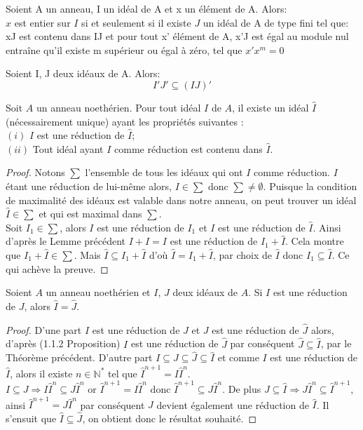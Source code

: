 \begin{maproposition}
	Soient A un anneau, I un idéal de A et x un élément de A. Alors:\\
	$x$ est entier sur $I$ si et seulement si il existe $J$ un idéal de A de type fini tel que: xJ est contenu dans IJ et pour tout x' élément de A, x'J est égal au module nul entraîne qu'il existe m supérieur ou égal à zéro, tel que $x'x^m = 0$
\end{maproposition}
\begin{moncorollaire}
	Soient I, J deux idéaux de A. Alors:
	\[ I'J' \subseteq (IJ)' \]
\end{moncorollaire}
\begin{montheoreme}
	Soit $A$ un anneau noethérien.
	Pour tout idéal $I$ de $A$, il existe un idéal $\hat{I}$ (nécessairement unique) ayant les propriétés suivantes : \\
	$(i)$ $I$ est une réduction de $\hat{I}$;\\
	$(ii)$ Tout idéal ayant $I$ comme réduction est contenu dans $\hat{I}$.
\end{montheoreme}
\begin{proof}
	Notons $\displaystyle \sum$ l'ensemble de tous les idéaux qui ont $I$ comme réduction. $I$ étant une réduction de lui-même alors, $I \in \displaystyle \sum$ donc $\displaystyle \sum \neq \emptyset$. Puisque la condition de maximalité des idéaux est valable dans notre anneau, on peut trouver un idéal $\hat{I} \in \displaystyle \sum$ et qui est maximal dans $\displaystyle \sum$.\\
	Soit $I_1 \in \displaystyle \sum$, alors $I$ est une réduction de $I_1$ et $I$ est une réduction de $\hat{I}$. Ainsi d'après le Lemme précédent $I+I=I$ est une réduction de $I_1+\hat{I}$. Cela montre que $I_1+\hat{I} \in \displaystyle \sum$. Mais $\hat{I} \subseteq I_1+\hat{I}$ d'où $\hat{I} = I_1+\hat{I}$, par choix de $\hat{I}$ donc $I_1 \subseteq \hat{I}$. Ce qui achève la preuve.
\end{proof} 
\begin{moncorollaire}
	Soient $A$ un anneau noethérien et $I$, $J$ deux idéaux de $A$. Si $I$ est une réduction de $J$, alors $\hat{I} = \hat{J}$.
\end{moncorollaire}
\begin{proof}
	D'une part $I$ est une réduction de $J$ et $J$ est une réduction de $\hat{J}$ alors, d'après (1.1.2 Proposition) $I$ est une réduction de $\hat{J}$ par conséquent $\hat{J} \subseteq \hat{I}$, par le Théorème précédent. D'autre part $I \subseteq J \subseteq \hat{J} \subseteq \hat{I}$ et comme $I$ est une réduction de $\hat{I}$, alors il existe $n \in \mathbb{N^*}$ tel que $\hat{I}^{n+1} = I \hat{I}^n$.\\
	$I \subseteq J \Rightarrow I \hat{I}^n \subseteq J \hat{I}^n$ or $\hat{I}^{n+1} = I \hat{I}^n$ donc $\hat{I}^{n+1} \subseteq J \hat{I}^n$. De plus $J \subseteq \hat{I} \Rightarrow  J \hat{I}^n \subseteq \hat{I}^{n+1}$, ainsi $\hat{I}^{n+1} = J \hat{I}^n$ par conséquent $J$ devient également une réduction de $\hat{I}$. Il s'ensuit que $\hat{I} \subseteq \hat{J}$, on obtient donc le résultat souhaité.
\end{proof}
